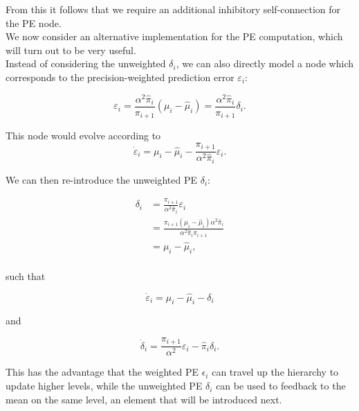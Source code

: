 From this it follows that we require an additional inhibitory self-connection for the \textsf{PE} node.\\

We now consider an alternative implementation for the \textsf{PE} computation, which will turn out to be very useful.\\

Instead of considering the unweighted $\delta_i$, we can also directly model a node which corresponds to the precision-weighted prediction error $\varepsilon_i$:

\begin{equation}
	\varepsilon_i = \frac{\alpha^2 \hat{\pi}_i}{\pi_{i+1}} (\mu_i - \hat{\mu}_i) = \frac{\alpha^2 \hat{\pi}_i}{\pi_{i+1}} \delta_i.
\end{equation}

This node would evolve according to
\begin{equation}
	\dot{\varepsilon}_i = \mu_i - \hat{\mu}_i -  \frac{\pi_{i+1}}{\alpha^2 \hat{\pi}_i} \varepsilon_i.
\end{equation}

We can then re-introduce the unweighted \textsf{PE} $\delta_i$:

\begin{equation}
	\begin{split}
		\delta_i &= \frac{\pi_{i+1}}{\alpha^2 \hat{\pi}_i} \varepsilon_i \\
		&= \frac{\pi_{i+1} (\mu_i - \hat{\mu}_i) \alpha^2 \hat{\pi}_i}{\alpha^2 \hat{\pi}_i \pi_{i+1}}\\
		&= \mu_i - \hat{\mu}_i,\\
	\end{split}
\end{equation}

such that

\begin{equation}
	\dot{\varepsilon}_i = \mu_i - \hat{\mu}_i - \delta_i
\end{equation}

and

\begin{equation}
	\dot{\delta}_i = \frac{\pi_{i+1}}{\alpha^2} \varepsilon_i - \hat{\pi}_i \delta_i.
\end{equation}

This has the advantage that the weighted \textsf{PE} $\epsilon_i$ can travel up the hierarchy to update higher levels, while the unweighted \textsf{PE} $\delta_i$ can be used to feedback to the mean on the same level, an element that will be introduced next.\\ 

